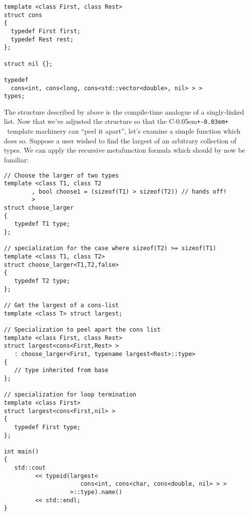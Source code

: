 \documentclass{netobjectdays}
\newcommand{\Cpp}{C\kern-0.05em\texttt{+\kern-0.03em+}%
}
\begin{document}
{\footnotesize
\begin{verbatim}
template <class First, class Rest>
struct cons
{
  typedef First first;
  typedef Rest rest;
};

struct nil {};

typedef
  cons<int, cons<long, cons<std::vector<double>, nil> > >
types;
\end{verbatim}
}

The structure described by  above is the compile-time
analogue of a singly-linked list. Now that we've adjusted the
structure so that the \Cpp\ template machinery can ``peel it apart'',
let's examine a simple function which does so. Suppose a user wished
to find the largest of an arbitrary collection of types. We can apply
the recursive metafunction formula which should by now be familiar:

{\footnotesize
\begin{verbatim}
// Choose the larger of two types
template <class T1, class T2
        , bool choose1 = (sizeof(T1) > sizeof(T2)) // hands off!
        >
struct choose_larger
{
   typedef T1 type;
};

// specialization for the case where sizeof(T2) >= sizeof(T1)
template <class T1, class T2>
struct choose_larger<T1,T2,false>
{
   typedef T2 type;
};

// Get the largest of a cons-list
template <class T> struct largest;

// Specialization to peel apart the cons list
template <class First, class Rest>
struct largest<cons<First,Rest> >
   : choose_larger<First, typename largest<Rest>::type>
{
   // type inherited from base
};

// specialization for loop termination
template <class First>
struct largest<cons<First,nil> >
{
   typedef First type;
};

int main()
{
   std::cout
         << typeid(largest<
                      cons<int, cons<char, cons<double, nil> > >
                   >::type).name()
         << std::endl;
}

\end{verbatim}
}
\end{document}
